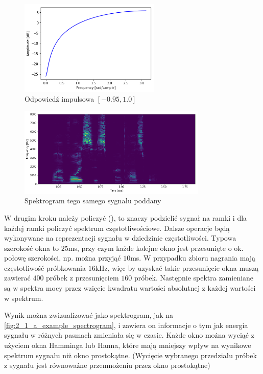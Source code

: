 \begin{figure}[H]
    \centering
    \includegraphics[width=0.6\textwidth]{images/2_1_c_preemphasis_response}
    \caption{Odpowiedź impulsowa  $[-0.95, 1.0]$}
    \label{fig:2_1_c_preemphasis_response}
\end{figure}

\begin{figure}[H]
    \centering
    \includegraphics[width=0.8\textwidth]{images/2_1_b_example_preemphasis}
    \caption{Spektrogram tego samego sygnału poddany }
    \label{fig:2_1_b_example_preemphasis}
\end{figure}

W drugim kroku należy policzyć  (), to znaczy podzielić
sygnał na ramki i dla każdej ramki policzyć spektrum częstotliwościowe. Dalsze operacje
będą wykonywane na reprezentacji sygnału w dziedzinie częstotliwości. Typowa szerokość
okna to $25$ms, przy czym każde kolejne okno jest przesunięte o ok. połowę szerokości,
np. można przyjąć $10$ms. W przypadku zbioru  nagrania mają częstotliwość próbkowania $16$kHz,
więc by uzyskać takie przesunięcie okna muszą zawierać $400$ próbek z przesunięciem $160$ próbek.
Następnie spektra zamieniane są w spektra mocy przez wzięcie kwadratu wartości absolutnej
z każdej wartości w spektrum.

Wynik  można zwizualizować jako spektrogram, jak na \ref{fig:2_1_a_example_spectrogram},
i zawiera on informacje o tym jak energia sygnału w różnych pasmach zmieniała się w czasie.
Każde okno można wyciąć z użyciem okna Hamminga lub Hanna, które mają mniejszy wpływ
na wynikowe spektrum sygnału niż okno prostokątne. (Wycięcie wybranego przedziału próbek
z sygnału jest równoważne przemnożeniu przez okno prostokątne)


